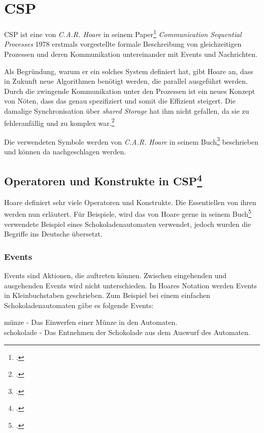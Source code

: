 \section{\acl{CSP}}
\acf{CSP} ist eine von \textit{C.A.R. Hoare} in seinem Paper\footcite{CSP} \textit{Communication Sequential Processes} 1978 erstmals vorgestellte formale Beschreibung von gleichzeitigen Prozessen und deren Kommunikation untereinander mit Events und Nachrichten.

Als Begründung, warum er ein solches System definiert hat, gibt Hoare an, dass in Zukunft neue Algorithmen benötigt werden, die parallel ausgeführt werden. Durch die zwingende Kommunikation unter den Prozessen ist ein neues Konzept von Nöten, dass das genau spezifiziert und somit die  Effizient steigert. Die damalige Synchronisation über \textit{shared Storage} hat ihm nicht gefallen, da sie zu fehleranfällig und zu komplex war.\footcite[Introduction]{CSP}

Die verwendeten Symbole werden von \textit{C.A.R. Hoare} in seinem Buch\footcite[Glossary of Symbols]{CSPBOOK} beschrieben und können da nachgeschlagen werden.
\subsection[Operatoren und Konstrukte in \acs{CSP}]{Operatoren und Konstrukte in \acs{CSP}\footcite[Siehe][Kap. 1.1]{CSPBOOK}}

Hoare definiert sehr viele Operatoren und Konstrukte. Die Essentiellen von ihren werden nun erläutert. Für Beispiele, wird das von Hoare gerne in seinem Buch\footcite{CSPBOOK} verwendete Beispiel eines Schokoladenautomaten verwendet, jedoch wurden die Begriffe ins Deutsche übersetzt.

\subsubsection{Events}
Events sind Aktionen, die auftreten können. Zwischen eingehenden und ausgehenden Events wird nicht unterschieden. In Hoares Notation werden Events in Kleinbuchstaben geschrieben.
Zum Beispiel bei einem einfachen Schokoladenautomaten gäbe es folgende Events:

\begin{addmargin}[1cm]{0cm}
münze - Das Einwerfen einer Münze in den Automaten.\\
schokolade - Das Entnehmen der Schokolade aus dem Auswurf des Automaten.
\end{addmargin}

